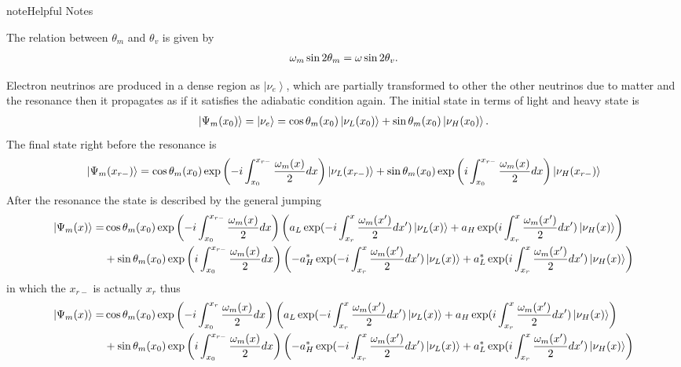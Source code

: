 \documentclass[letterpaper,12pt,english]{sphinxmanual}
\newcommand{\ket}[1]{\left| #1\right\rangle}
\begin{document}
\begin{notice}{note}{Helpful Notes}

The relation between \(\theta_m\) and \(\theta_v\) is given by
\begin{gather}
\begin{split}\omega_m\sin 2\theta_m =  \omega \sin 2\theta_v.\end{split}\notag
\end{gather}\end{notice}

Electron neutrinos are produced in a dense region as \(\ket{\nu_e}\), which are partially transformed to other the other neutrinos due to matter and the resonance then it propagates as if it satisfies the adiabatic condition again. The initial state in terms of light and heavy state is
\begin{gather}
\begin{split}\ket{\Psi_{m}(x_0)} = \ket{\nu_e}= \cos \theta_m(x_0) \ket{\nu_L(x_0)} + \sin \theta_m(x_0) \ket{\nu_H(x_0)}.\end{split}\notag
\end{gather}
The final state right before the resonance is
\begin{gather}
\begin{split}\ket{\Psi_{m}(x_{r-})} = \cos\theta_m(x_{0}) \exp\left( -i \int_{x_0}^{x_{r-}} \frac{\omega_m(x)}{2} dx   \right) \ket{\nu_L(x_{r-})} + \sin\theta_m(x_{0}) \exp\left( i \int_{x_0}^{x_{r-}} \frac{\omega_m(x)}{2} dx \right) \ket{\nu_H(x_{r-})}\end{split}\notag
\end{gather}
After the resonance the state is described by the general jumping
\begin{gather}
\begin{split}\ket{\Psi_{m}(x)}= &  \cos\theta_m(x_0) \exp\left( -i \int_{x_0}^{x_{r-}} \frac{\omega_m(x)}{2} dx   \right)  \left(  a_L \exp( -i \int_{x_r}^x \frac{\omega_m(x')}{2}dx' ) \ket{\nu_L(x)}  + a_H \exp( i\int_{x_r}^x \frac{\omega_m(x')}{2}dx' ) \ket{\nu_H(x)}  \right)  \\
& + \sin\theta_m(x_{0}) \exp\left( i \int_{x_0}^{x_{r-}} \frac{\omega_m(x)}{2} dx \right)  \left(  -a_H^* \exp( -i \int_{x_r}^x \frac{\omega_m(x')}{2}dx' ) \ket{\nu_L(x)}  + a_L^* \exp( i\int_{x_r}^x \frac{\omega_m(x')}{2}dx' ) \ket{\nu_H(x)}  \right)\end{split}\notag
\end{gather}
in which the \(x_{r-}\) is actually \(x_r\) thus
\begin{gather}
\begin{split}\ket{\Psi_{m}(x)}= &  \cos\theta_m(x_0) \exp\left( -i \int_{x_0}^{x_{r}} \frac{\omega_m(x)}{2} dx   \right)  \left(  a_L \exp( -i \int_{x_r}^x \frac{\omega_m(x')}{2}dx' ) \ket{\nu_L(x)}  + a_H \exp( i\int_{x_r}^x \frac{\omega_m(x')}{2}dx' ) \ket{\nu_H(x)}  \right)  \\
& + \sin\theta_m(x_{0}) \exp\left( i \int_{x_0}^{x_{r-}} \frac{\omega_m(x)}{2} dx \right)  \left(  -a_H^* \exp( -i \int_{x_r}^x \frac{\omega_m(x')}{2}dx' ) \ket{\nu_L(x)}  + a_L^* \exp( i\int_{x_r}^x \frac{\omega_m(x')}{2}dx' ) \ket{\nu_H(x)}  \right)\end{split}\notag
\end{gather}
\end{document}

